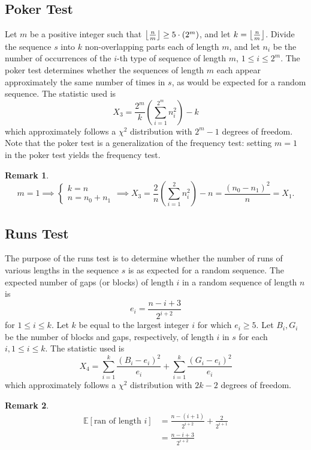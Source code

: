 \documentclass[12pt,openany]{book}
\DeclarePairedDelimiter{\floor}{\lfloor}{\rfloor}
\theoremstyle{definition}
\newtheorem{remark}{Remark}[chapter]
\newcommand{\E}{\mathbb{E}}
\newcommand{\of}[1]{\left(#1\right)}
\begin{document}
\subsection{Poker Test}
\begin{tcolorbox}[colback=white,colframe=lemcolor,arc=5pt,title={\color{white}\bf Poker Test}]
	Let \( m \) be a positive integer such that \( \floor*{\frac{n}{m}} \geq 5 \cdot (2^m) \), and let \( k = \floor*{\frac{n}{m}} \). Divide the sequence \( s \) into \( k \) non-overlapping parts each of length \( m \), and let \( n_i \) be the number of occurrences of the \( i \)-th type of sequence of length \( m \), \( 1 \leq i \leq 2^m \). The poker test determines whether the sequences of length \( m \) each appear approximately the same number of times in \( s \), as would be expected for a random sequence. The statistic used is
	\[ X_3 = \frac{2^m}{k} \left( \sum_{i=1}^{2^m} n_i^2 \right) - k \]
	which approximately follows a \( \chi^2 \) distribution with \( 2^m - 1 \) degrees of freedom. Note that the poker test is a generalization of the frequency test: setting \( m = 1 \) in the poker test yields the frequency test.
\end{tcolorbox}

\begin{remark}
	\[
	m=1\implies\begin{cases}
		k=n\\
		n=n_0+n_1
	\end{cases}\implies X_3=\frac{2}{n}\of{\sum_{i=1}^2n_i^2}-n=\frac{(n_0-n_1)^2}{n}=X_1.
	\]
\end{remark}

\subsection{Runs Test}
\begin{tcolorbox}[colback=white,colframe=lemcolor,arc=5pt,title={\color{white}\bf Runs Test}]
	The purpose of the runs test is to determine whether the number of runs of various lengths in the sequence \( s \) is as expected for a random sequence. The expected number of gaps (or blocks) of length \( i \) in a random sequence of length \( n \) is
	\[ e_i = \frac{n-i+3}{2^{i+2}} \]
	for \( 1 \leq i \leq k \). Let \( k \) be equal to the largest integer \( i \) for which \( e_i \geq 5 \). Let \( B_i, G_i \) be the number of blocks and gaps, respectively, of length \( i \) in \( s \) for each \( i, 1 \leq i \leq k \). The statistic used is
	\[ X_4 = \sum_{i=1}^{k} \frac{(B_i - e_i)^2}{e_i} + \sum_{i=1}^{k} \frac{(G_i - e_i)^2}{e_i} \]
	which approximately follows a \( \chi^2 \) distribution with \( 2k - 2 \) degrees of freedom.
\end{tcolorbox}
\begin{remark}
	\begin{align*}
		\E[\text{ran of length $i$}] &=\frac{n-(i+1)}{2^{i+2}}+\frac{2}{2^{i+1}}\\
		&=\frac{n-i+3}{2^{i+2}}
	\end{align*}
\end{remark}
\end{document}
